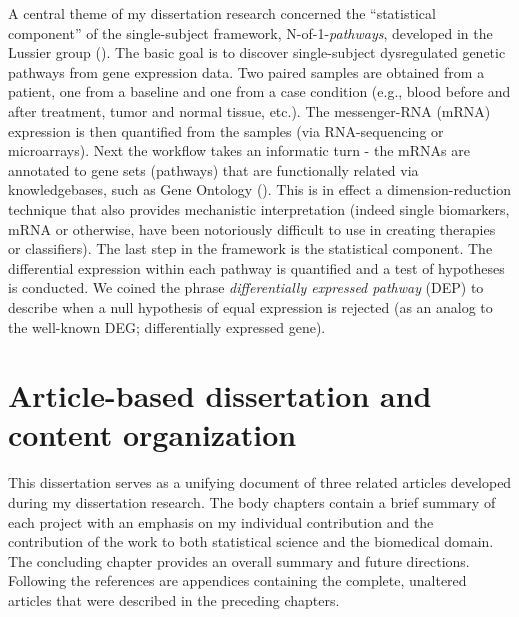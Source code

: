 \indent \indent A central theme of my dissertation research concerned the ``statistical component'' of the single-subject framework, N-of-1-\emph{pathways}, developed in the Lussier group (\cite{Gardeux2014}). The basic goal is to discover single-subject dysregulated genetic pathways from gene expression data. Two paired samples are obtained from a patient, one from a baseline and one from a case condition (e.g., blood before and after treatment, tumor and normal tissue, etc.). The messenger-RNA (mRNA) expression is then quantified from the samples (via RNA-sequencing or microarrays). Next the workflow takes an informatic turn - the mRNAs are annotated to gene sets (pathways) that are functionally related via knowledgebases, such as Gene Ontology (\cite{Ashburner2000}). This is in effect a dimension-reduction technique that also provides mechanistic interpretation (indeed single biomarkers, mRNA or otherwise, have been notoriously difficult to use in creating therapies or classifiers). The last step in the framework is the statistical component. The differential expression within each pathway is quantified and a test of hypotheses is conducted. We coined the phrase \emph{differentially expressed pathway} (DEP) to describe when a null hypothesis of equal expression is rejected (as an analog to the well-known DEG; differentially expressed gene). 

\section{Article-based dissertation and content organization}\label{sec:org}
\indent \indent This dissertation serves as a unifying document of three related articles developed during my dissertation research. The body chapters contain a brief summary of each project with an emphasis on my individual contribution and the contribution of the work to both statistical science and the biomedical domain. The concluding chapter provides an overall summary and future directions. Following the references are appendices containing the complete, unaltered articles that were described in the preceding chapters.

